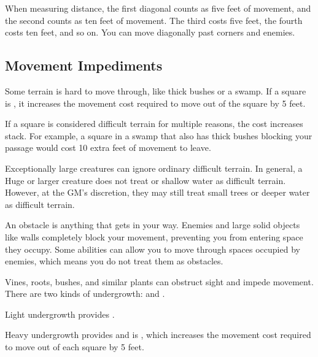     When measuring distance, the first diagonal counts as five feet of movement, and the second counts as ten feet of movement.
    The third costs five feet, the fourth costs ten feet, and so on.
    You can move diagonally past corners and enemies.

  \subsection{Movement Impediments}

    Some terrain is hard to move through, like thick bushes or a swamp.
    If a square is , it increases the movement cost required to move out of the square by 5 feet.

    If a square is considered difficult terrain for multiple reasons, the cost increases stack.
    For example, a square in a swamp that also has thick bushes blocking your passage would cost 10 extra feet of movement to leave.

    Exceptionally large creatures can ignore ordinary difficult terrain.
    In general, a Huge or larger creature does not treat  or shallow water as difficult terrain.
    However, at the GM's discretion, they may still treat small trees or deeper water as difficult terrain.

    An obstacle is anything that gets in your way.
    Enemies and large solid objects like walls completely block your movement, preventing you from entering space they occupy.
    Some abilities can allow you to move through spaces occupied by enemies, which means you do not treat them as obstacles.

     Vines, roots, bushes, and similar plants can obstruct sight and impede movement.
    There are two kinds of undergrowth:  and .

    Light undergrowth provides .

    Heavy undergrowth provides  and is , which increases the movement cost required to move out of each square by 5 feet.

